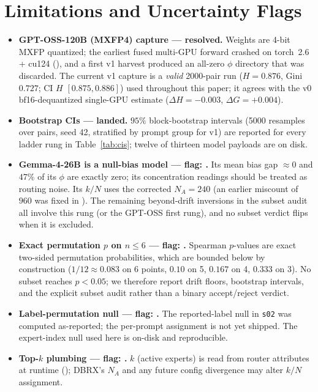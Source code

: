\documentclass[sigconf]{acmart}
\begin{document}
\section{Limitations and Uncertainty Flags}
\label{sec:limits}
\begin{itemize}
\item \textbf{GPT-OSS-120B (MXFP4) capture --- resolved.}
Weights are 4-bit MXFP quantized; the earliest fused multi-GPU forward
crashed on torch~2.6 + cu124 (), and a
first v1 harvest produced an all-zero $\phi$ directory that was discarded.
The current v1 capture is a \emph{valid} 2000-pair run
($H = 0.876$, Gini $0.727$; CI $H$ $[0.875, 0.886]$) used throughout this
paper; it agrees with the v0 bf16-dequantized single-GPU estimate
($\Delta H = -0.003$, $\Delta G = +0.004$).
\item \textbf{Bootstrap CIs --- landed.}
$95\%$ block-bootstrap intervals (5000 resamples over pairs, seed 42,
stratified by prompt group for v1) are reported for every ladder rung in
Table~\ref{tab:cis}; twelve of thirteen model payloads are on disk.
\item \textbf{Gemma-4-26B is a null-bias model --- flag:
.} Its mean bias gap $\approx 0$ and $47\%$ of its
$\phi$ are exactly zero; its concentration readings should be treated as
routing noise. Its $k/N$ uses the corrected $N_A = 240$ (an earlier
miscount of $960$ was fixed in ). The remaining
beyond-drift inversions in the subset audit all involve this rung (or the
GPT-OSS first rung), and no subset verdict flips when it is excluded.
\item \textbf{Exact permutation $p$ on $n \le 6$ --- flag:
.} Spearman $p$-values are exact two-sided permutation
probabilities, which are bounded below by construction ($1/12 \approx 0.083$
on 6 points, $0.10$ on 5, $0.167$ on 4, $0.333$ on 3). No subset reaches
$p < 0.05$; we therefore report drift floors, bootstrap intervals, and the
explicit subset audit rather than a binary accept/reject verdict.
\item \textbf{Label-permutation null --- flag: \allowbreak
{}.}
The reported-label null in \texttt{s02} was computed as-reported; the
per-prompt assignment is not yet shipped. The expert-index null used here
is on-disk and reproducible.
\item \textbf{Top-$k$ plumbing --- flag: .} $k$
(active experts) is read from router attributes at runtime
(); DBRX's $N_A$ and any future config divergence may
alter $k/N$ assignment.
\end{itemize}
\end{document}
